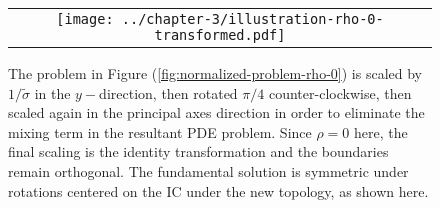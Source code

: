 %

\begin{figure}
  \centering
  \begin{tabular}{c}
    \begin{minipage}{0.40\textwidth}
      \centering
      \texttt{[image: ../chapter-3/illustration-rho-0-transformed.pdf]}
      \caption{The problem in Figure
        (\ref{fig:normalized-problem-rho-0}) is scaled by
        $1/\tilde{\sigma}$ in the $y-$direction, then rotated $\pi/4$
        counter-clockwise, then scaled again in the principal axes
        direction in order to eliminate the mixing term in the
        resultant PDE problem. Since $\rho=0$ here, the final scaling
        is the identity transformation and the boundaries remain
        orthogonal. The fundamental solution is symmetric under
        rotations centered on the IC under the new topology, as shown
        here.}
      \label{fig:transformed-problem-rho-0}
    \end{minipage}
  \end{tabular}
\end{figure}

